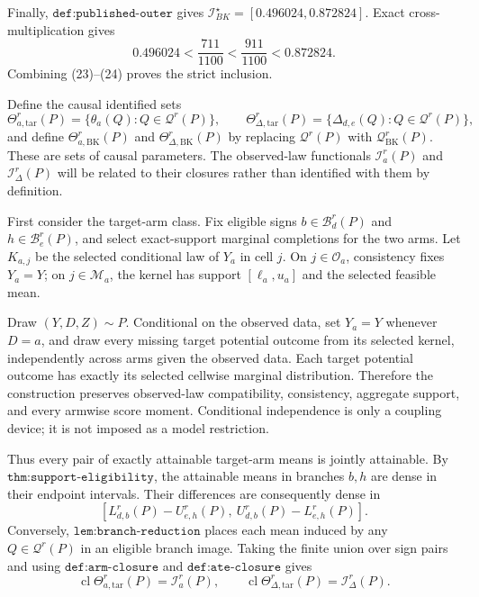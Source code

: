 Finally, \(\texttt{def:published-outer}\) gives \(\mathcal I_{BK}^\star=[0.496024,0.872824]\).  Exact cross-multiplication gives
\[
 0.496024<\frac{711}{1100}<\frac{911}{1100}<0.872824.                          \tag{24}
\]
Combining (23)--(24) proves the strict inclusion.

Define the causal identified sets
\[
 \Theta_{a,\mathrm{tar}}^r(P)=\{\theta_a(Q):Q\in\mathcal Q^r(P)\},\qquad
 \Theta_{\Delta,\mathrm{tar}}^r(P)=\{\Delta_{d,e}(Q):Q\in\mathcal Q^r(P)\}, \tag{25}
\]
and define \(\Theta_{a,\mathrm{BK}}^r(P)\) and \(\Theta_{\Delta,\mathrm{BK}}^r(P)\) by replacing \(\mathcal Q^r(P)\) with \(\mathcal Q_{\mathrm{BK}}^r(P)\).  These are sets of causal parameters.  The observed-law functionals \(\mathcal I_a^r(P)\) and \(\mathcal I_\Delta^r(P)\) will be related to their closures rather than identified with them by definition.

First consider the target-arm class.  Fix eligible signs \(b\in\mathcal B_d^r(P)\) and \(h\in\mathcal B_e^r(P)\), and select exact-support marginal completions for the two arms.  Let \(K_{a,j}\) be the selected conditional law of \(Y_a\) in cell \(j\).  On \(j\in\mathcal O_a\), consistency fixes \(Y_a=Y\); on \(j\in\mathcal M_a\), the kernel has support \([\ell_a,u_a]\) and the selected feasible mean.

Draw \((Y,D,Z)\sim P\).  Conditional on the observed data, set \(Y_a=Y\) whenever \(D=a\), and draw every missing target potential outcome from its selected kernel, independently across arms given the observed data.  Each target potential outcome has exactly its selected cellwise marginal distribution.  Therefore the construction preserves observed-law compatibility, consistency, aggregate support, and every armwise score moment.  Conditional independence is only a coupling device; it is not imposed as a model restriction.

Thus every pair of exactly attainable target-arm means is jointly attainable.  By \(\texttt{thm:support-eligibility}\), the attainable means in branches \(b,h\) are dense in their endpoint intervals.  Their differences are consequently dense in
\[
 [L_{d,b}^r(P)-U_{e,h}^r(P),\ U_{d,b}^r(P)-L_{e,h}^r(P)].                     \tag{26}
\]
Conversely, \(\texttt{lem:branch-reduction}\) places each mean induced by any \(Q\in\mathcal Q^r(P)\) in an eligible branch image.  Taking the finite union over sign pairs and using \(\texttt{def:arm-closure}\) and \(\texttt{def:ate-closure}\) gives
\[
 \operatorname{cl}\Theta_{a,\mathrm{tar}}^r(P)=\mathcal I_a^r(P),
 \qquad
 \operatorname{cl}\Theta_{\Delta,\mathrm{tar}}^r(P)=\mathcal I_\Delta^r(P). \tag{27}
\]

